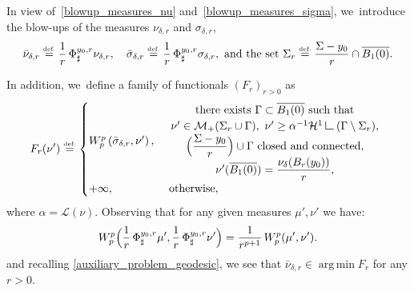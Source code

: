 \documentclass[10pt]{amsart}
\theoremstyle{definition}
\newcommand{\eqdef}{\ensuremath{\stackrel{\mbox{\upshape\tiny def.}}{=}}}
\newcommand\LM[1]{\hbox{\vrule width.5pt \vbox to#1pt{\vfill \hrule width#1pt height.5pt}}}
\newcommand\LL{{\mathchoice {\>\LM7\>}{\>\LM7\>}{\,\LM5\,}{\,\LM{3.35}\,}}}
\newcommand{\mres}{\LL}
\newcommand\cH{\mathcal{H}}
\DeclareMathOperator*{\argmin}{arg\,min}
\begin{document}
In view of~\eqref{blowup_measures_nu} and~\eqref{blowup_measures_sigma}, we~introduce the blow-ups of the measures $\nu_{\delta ,r}$ and $\sigma_{\delta , r}$,
\begin{equation}\label{blowup_measures_renormalized}
\bar\nu_{\delta ,r}
\eqdef
\frac{1}{r}\,
\Phi^{y_0,r}_{\sharp}
\nu_{\delta ,r},
\quad
\bar\sigma_{\delta ,r}
\eqdef
\frac{1}{r}\,\Phi^{y_0,r}_{\sharp}
\sigma_{\delta , r},
\text{ and the set }
\Sigma_r \eqdef
\frac{\Sigma - y_0}{r}\cap \overline{B_1(0)}.
\end{equation}

In addition, we~define a family of functionals ${\left(F_r\right)}_{r > 0}$ as
\begin{equation}\label{family_Fr}
F_r(\nu') \eqdef
\begin{cases}
W_p^p\left(
\bar \sigma_{\delta ,r},
\nu'
\right),&
\begin{array}{c}
\text{there exists $\Gamma \subset \overline{B_1(0)}$ such that}\\
\nu' \in \mathcal{M}_+(\Sigma_r \cup \Gamma), \
\nu' \ge \alpha^{-1}\cH^1\mres(\Gamma\setminus \Sigma_r),\\
\Bigl(\dfrac{\Sigma-y_0}{r}\Bigr) \cup \Gamma \text{ closed and connected}, \\
\nu'(\overline{B_1(0)}) = \dfrac{\nu_\delta(B_r(y_0))}{r},
\end{array} \\
+\infty,& \text{ otherwise,}
\end{cases}
\end{equation}
where $\alpha = \mathcal{L}(\nu)$.
Observing that for any given measures $\mu', \nu'$ we have:
\begin{equation}\label{blowup_Wasserstein_identity}
W_p^p
\Bigl(
\frac{1}{r}\,\Phi^{y_0, r}_\sharp \mu',
\frac{1}{r}\,\Phi^{y_0, r}_\sharp \nu'
\Bigr)
=
\frac{1}{r^{p+1}}\,
W_p^p( \mu', \nu').
\end{equation}
and recalling
\eqref{auxiliary_problem_geodesic},
we see that $\bar \nu_{\delta ,r} \in \argmin F_r$ for any $r>0$.
\end{document}
